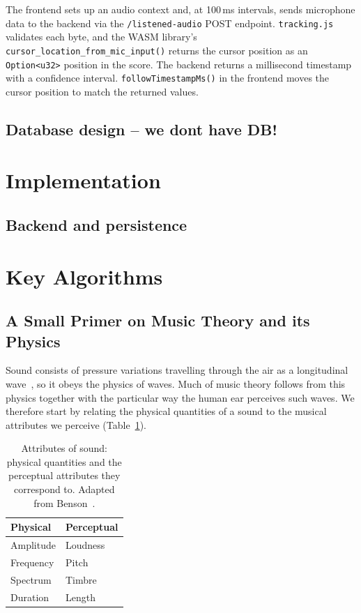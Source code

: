 The frontend sets up an audio context and, at 100\,ms intervals, sends microphone data to the backend via the \texttt{/listened-audio} POST endpoint. \texttt{tracking.js} validates each byte, and the WASM library's \texttt{cursor\_location\_from\_mic\_input()} returns the cursor position as an \texttt{Option<u32>} position in the score. The backend returns a millisecond timestamp with a confidence interval. \texttt{followTimestampMs()} in the frontend moves the cursor position to match the returned values.

\subsection{Database design -- we dont have DB!}

\section{Implementation}

\subsection{Backend and persistence}

\section{Key Algorithms}
\label{sec:key-algorithms}


\subsection{A Small Primer on Music Theory and its Physics}

Sound consists of pressure variations travelling through the air as a
longitudinal wave~\cite[\S1.1, pp.~1--2]{benson2006music}, so it obeys the
physics of waves. Much of music theory follows from this physics together
with the particular way the human ear perceives such waves. We therefore
start by relating the physical quantities of a sound to the musical
attributes we perceive (Table~\ref{tab:sound-attributes}).

\begin{table}[htbp]
  \centering
  \begin{tabular}{ll}
    \toprule
    Physical & Perceptual \\
    \midrule
    Amplitude & Loudness \\
    Frequency & Pitch    \\
    Spectrum  & Timbre   \\
    Duration  & Length   \\
    \bottomrule
  \end{tabular}
  \caption{Attributes of sound: physical quantities and the perceptual
  attributes they correspond to. Adapted from
  Benson~\cite[\S1.1, p.~2]{benson2006music}.}
  \label{tab:sound-attributes}
\end{table}

